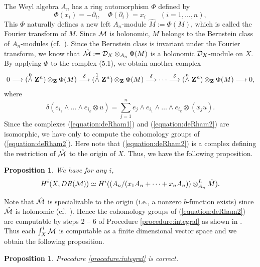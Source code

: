 \documentclass[12pt]{article}
\def\Z{ {\bf Z} }
\def\Dsc{ {\cal D} }
\def\Msc{ {\cal M} }
\newtheorem{proposition}[theorem]{Proposition}
\begin{document}
The Weyl algebra $A_n$ has a ring automorphism $\Phi$ defined by
$$ 
\Phi(x_i) =  -\partial_i,\quad
\Phi(\partial_i) =  x_i \qquad (i=1,\dots,n),
$$
This $\Phi$ naturally defines a new left $A_n$-module ${\hat M}:=\Phi(M)$, 
which is called the Fourier transform of $M$.  
Since $\Msc$ is holonomic, $M$ belongs to the Bernstein class 
of $A_n$-modules (cf.\ \cite[p.125]{BjorkBook}).  
Since the Bernstein class is invariant under the Fourier transform, 
we know that $\hat\Msc := \Dsc_X\otimes_{A_n}\Phi(M)$ 
is a holonomic $\Dsc_X$-module on $X$.   
By applying $\Phi$ to the complex (5.1), we obtain another complex
\begin{equation} \label{equation:deRham2}
0 \longrightarrow (\stackrel{0}{\wedge}\Z^n)\otimes_\Z \Phi(M) 
\stackrel{\delta}{\longrightarrow} (\stackrel{1}{\wedge}\Z^n) \otimes_\Z\Phi(M)
\stackrel{\delta}{\longrightarrow}
\cdots
\stackrel{\delta}{\longrightarrow}  (\stackrel{n}{\wedge}\Z^n) 
\otimes_\Z\Phi(M)
\longrightarrow 0, 
\end{equation}
where
$$
\delta(e_{i_1}\wedge\dots\wedge e_{i_k}\otimes u) = 
\sum_{j=1}^n e_j\wedge e_{i_1}\wedge\dots\wedge e_{i_k}\otimes (x_ju).
$$
Since the complexes (\ref{equation:deRham1}) and 
(\ref{equation:deRham2}) are isomorphic, we have only to
compute the cohomology groups of (\ref{equation:deRham2}).  
Here note that (\ref{equation:deRham2}) 
is a complex defining the restriction of $\hat\Msc$ 
to the origin of $X$.  
Thus, we have the following proposition.

\begin{proposition}
\label{proposition:6.1}
We have for any $i$, 
$$
H^i(X,DR(\Msc))\simeq H^i((A_n/(x_1A_n +\dots + x_nA_n))\otimes^L_{A_n}\hat M).
$$
\end{proposition}

Note that $\hat\Msc$ is specializable to the origin (i.e., a nonzero
$b$-function exists) since $\hat\Msc$ is holonomic (cf.\ \cite{KKholonomic3}).
Hence the cohomology groups of (\ref{equation:deRham2}) 
are computable by steps 2 -- 6 of Procedure \ref{procedure:integral}
as shown in \cite{OakuAdvance2}.
Thus each $\int_X^i\Msc$ is computable as a finite dimensional vector space
and we obtain the following proposition.

\begin{proposition}
\label{proposition:6.2}
Procedure \ref{procedure:integral} is correct.
\end{proposition}
\end{document}
